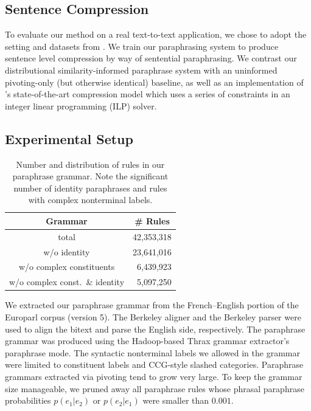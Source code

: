 \documentclass[11pt]{article}
\begin{document}
\subsection{Sentence Compression}

To evaluate our method on a real text-to-text application, we chose to
adopt the setting and datasets from \cite{Ganitkevitch2011}. We train
our paraphrasing system to produce sentence level compression by way
of sentential paraphrasing. We contrast our distributional
similarity-informed paraphrase system with an uninformed pivoting-only
(but otherwise identical) baseline, as well as an implementation of
's state-of-the-art compression model which uses a
series of constraints in an integer linear programming (ILP) solver.

\subsection{Experimental Setup}
\label{sec-setup}

\begin{table}
\small
\begin{center}
\begin{tabular}{|c|r|}
  \hline
  Grammar & \multicolumn{1}{c|}{\# Rules} \\
  \hline
  total & 42,353,318 \\
  w/o identity & 23,641,016 \\
  w/o complex constituents & 6,439,923 \\
  w/o complex const.\ \& identity & 5,097,250 \\
  \hline
\end{tabular}
\end{center}
\normalsize
\caption{Number and distribution of rules in our paraphrase
  grammar. Note the significant number of identity paraphrases and
  rules with complex nonterminal labels.}
\label{grammar_stats}
\end{table}

We extracted our paraphrase grammar from the French--English portion
of the Europarl corpus (version 5). The Berkeley aligner and the
Berkeley parser were used to align the bitext and parse the English
side, respectively. The paraphrase grammar was produced using the
Hadoop-based Thrax grammar extractor's paraphrase mode. The syntactic
nonterminal labels we allowed in the grammar were limited to
constituent labels and CCG-style slashed categories. Paraphrase
grammars extracted via pivoting tend to grow very large. To keep the
grammar size manageable, we pruned away all paraphrase rules whose
phrasal paraphrase probabilities $p(e_1|e_2)$ or $p(e_2|e_1)$ were
smaller than $0.001$.
\end{document}
